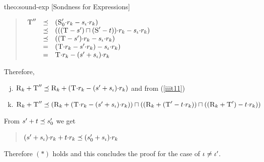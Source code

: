 \begin{proofOf}{theo:sound-exp} [Sondness for Expressions]
\begin{description}
\begin{quote}
$
\begin{array}{lcl}
\textsc{T}''&\preceq&(\textsc{S}'_0{\cdot}r_k-s_{\iota}{\cdot}r_k)\\
&\preceq&(((\textsc{T}-s')\sqcap(\textsc{S}'-t)){\cdot}r_k-s_{\iota}{\cdot}r_k)\\ 
&\preceq&((\textsc{T}-s'){\cdot}r_k-s_{\iota}{\cdot}r_k)\\ 
&=&(\textsc{T}{\cdot}r_k-s'{\cdot}r_k)-s_{\iota}{\cdot}r_k)\\ 
&=&\textsc{T}{\cdot}r_k-(s'+s_{\iota}){\cdot}r_k\\
\end{array}
$
\end{quote}

Therefore, 
\begin{enumerate}[(a)] \setcounter{enumi}{9}
\item \label{iiit12} 
 $\textsc{R}_k+\textsc{T}''\preceq\textsc{R}_k+(\textsc{T}{\cdot}r_k-(s'+s_{\iota}){\cdot}r_k)$ and from (\ref{iiit11})
 \item \label{iiit13}
  $\textsc{R}_k+\textsc{T}''\preceq(\textsc{R}_k+(\textsc{T}{\cdot}r_k-(s'+s_{\iota}){\cdot}r_k))\sqcap((\textsc{R}_k+(\textsc{T}'-t{\cdot}r_k))\sqcap((\textsc{R}_k+\textsc{T}')-t{\cdot}r_k))$
\end{enumerate}
From $s'+t\preceq s'_0$ we get 
 \begin{quote}
 $
(s'+s_{\iota}){\cdot}r_k+t{\cdot}r_k\preceq(s'_0+s_{\iota}){\cdot}r_k
$
 \end{quote}
Therefore $(\ast)$ holds and this concludes the proof for the case of  $\iota\neq\iota'$.



\end{description}
\end{proofOf}
